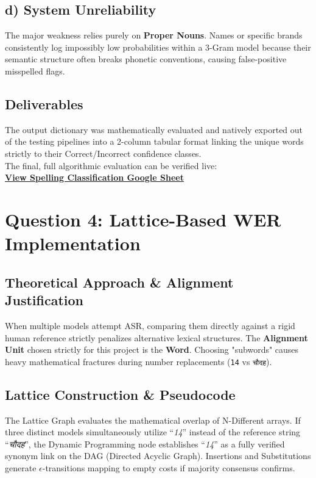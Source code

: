 \documentclass[11pt]{article}
\begin{document}
\subsection*{d) System Unreliability}
The major weakness relies purely on \textbf{Proper Nouns}. Names or specific brands consistently log impossibly low probabilities within a 3-Gram model because their semantic structure often breaks phonetic conventions, causing false-positive misspelled flags.

\subsection*{Deliverables}
The output dictionary was mathematically evaluated and natively exported out of the testing pipelines into a 2-column tabular format linking the unique words strictly to their Correct/Incorrect confidence classes. \\
The final, full algorithmic evaluation can be verified live: \\
\href{YOUR_GOOGLE_SHEETS_LINK_HERE}{\textbf{View Spelling Classification Google Sheet}}


\section*{Question 4: Lattice-Based WER Implementation}
\subsection*{Theoretical Approach \& Alignment Justification}
When multiple models attempt ASR, comparing them directly against a rigid human reference strictly penalizes alternative lexical structures. The \textbf{Alignment Unit} chosen strictly for this project is the \textbf{Word}. Choosing "subwords" causes heavy mathematical fractures during number replacements (\texttt{14} vs \texttt{\texthindi{चौदह}}).

\subsection*{Lattice Construction \& Pseudocode}
The Lattice Graph evaluates the mathematical overlap of N-Different arrays. If three distinct models simultaneously utilize ``\textsl{14}'' instead of the reference string ``\textsl{\texthindi{चौदह}}'', the Dynamic Programming node establishes ``\textsl{14}'' as a fully verified synonym link on the DAG (Directed Acyclic Graph). Insertions and Substitutions generate $\epsilon$-transitions mapping to empty costs if majority consensus confirms. 
\end{document}
